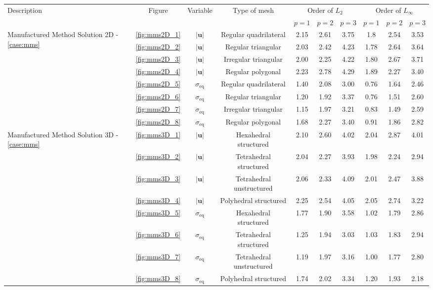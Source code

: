 \documentclass[review,3p]{elsarticle}
\begin{document}
\begin{table}[h]
	\centering
	\setlength{\tabcolsep}{4pt}
	\renewcommand{\arraystretch}{1.15}%
	{\color{violet}
	\begin{tabular}{lc|c|c|ccc|ccc|}
		
		\multirow{2}{*}{Description} & \multirow{2}{*}{Figure} & \multirow{2}{*}{Variable} & \multirow{2}{*}{Type of mesh}
		& \multicolumn{3}{c|}{Order of $L_2$}
		& \multicolumn{3}{c|}{Order of $L_\infty$} \\ 
		
		 & & & & $p=1$ & $p=2$ & $p=3$
		& $p=1$ & $p=2$ & $p=3$ \\
		\hline
		\multirow{8}{3cm}{Manufactured Method Solution 2D - \ref{case:mms}} & \ref{fig:mms2D_1} & $|\mathbf{u}|$ & Regular quadrilateral & 2.15 & 2.61 & 3.75 & 1.8 & 2.54 & 3.53 \\
		&\ref{fig:mms2D_2} & $|\mathbf{u}|$ & Regular triangular & 2.03 & 2.42 & 4.23 & 1.78 & 2.64 & 3.64 \\
		&\ref{fig:mms2D_3} & $|\mathbf{u}|$ & Irregular triangular & 2.00 & 2.25 & 4.22 & 1.80 & 2.67 & 3.71 \\
		&\ref{fig:mms2D_4} & $|\mathbf{u}|$ & Regular polygonal & 2.23 & 2.78 & 4.29 & 1.89 & 2.27 & 3.40 \\
		&\ref{fig:mms2D_5} & $\sigma_{\mathrm{eq}}$ & Regular quadrilateral & 1.40 & 2.08 & 3.00 & 0.76 & 1.64 & 2.46 \\
		&\ref{fig:mms2D_6} & $\sigma_{\mathrm{eq}}$ & Regular triangular & 1.20 & 1.92 & 3.37 & 0.76 & 1.51 & 2.60 \\
		&\ref{fig:mms2D_7} & $\sigma_{\mathrm{eq}}$ & Irregular triangular & 1.15 & 1.97 & 3.21 & 0.83 & 1.49 & 2.59 \\
		&\ref{fig:mms2D_8} & $\sigma_{\mathrm{eq}}$ & Regular polygonal & 1.68 & 2.27 & 3.40 & 0.91 & 1.86 & 2.82 \\
		\hline
		
		\multirow{8}{3cm}{Manufactured Method Solution 3D - \ref{case:mms}} & \ref{fig:mms3D_1} & $|\mathbf{u}|$ & Hexahedral structured & 2.10 & 2.60 & 4.02 & 2.04 & 2.87 & 4.01 \\
		&\ref{fig:mms3D_2} & $|\mathbf{u}|$ & Tetrahedral structured & 2.04 & 2.27 & 3.93 & 1.98 & 2.24 & 2.94 \\
		&\ref{fig:mms3D_3} & $|\mathbf{u}|$ & Tetrahedral unstructured & 2.06 & 2.33 & 4.09 & 2.01 & 2.47 & 3.88 \\
		&\ref{fig:mms3D_4} & $|\mathbf{u}|$ & Polyhedral structured & 2.25 & 2.54 & 4.05 & 2.05 & 2.74 & 3.22 \\
		&\ref{fig:mms3D_5} & $\sigma_{\mathrm{eq}}$ & Hexahedral structured & 1.77 & 1.90 & 3.58 & 1.02 & 1.79 & 2.86 \\
		&\ref{fig:mms3D_6} & $\sigma_{\mathrm{eq}}$ & Tetrahedral structured & 1.25 & 1.94 & 3.03 & 1.03 & 1.83 & 2.94 \\
		&\ref{fig:mms3D_7} & $\sigma_{\mathrm{eq}}$ & Tetrahedral unstructured & 1.19 & 1.97 & 3.16 & 1.00 & 1.77 & 2.80 \\
		&\ref{fig:mms3D_8} & $\sigma_{\mathrm{eq}}$ & Polyhedral structured & 1.74 & 2.02 & 3.34 & 1.20 & 1.93 & 2.18 \\
		\hline
		

\end{tabular}}
\end{table}
\end{document}
